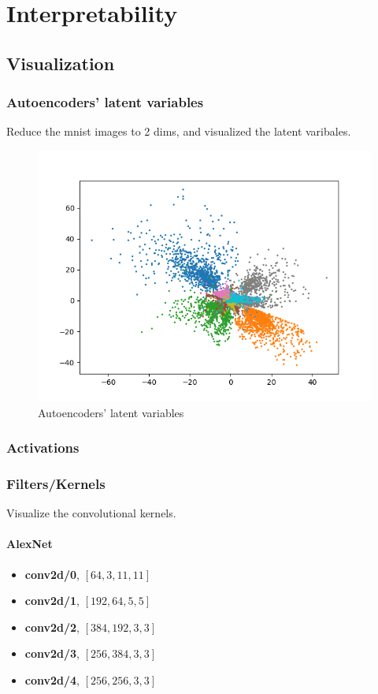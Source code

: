 \chapter{Interpretability}
\section{Visualization}
\subsection{Autoencoders' latent variables}
Reduce the mnist images to 2 dims, and visualized the latent varibales.

\begin{figure}[H]
    \centering
    \includegraphics[width=12cm]{images/ae_2dims_latent_variables.png}
    \caption{Autoencoders' latent variables}
    \label{fig:ae_2dims_latent_variables}
\end{figure}

\subsection{Activations}

\subsection{Filters/Kernels}
Visualize the convolutional kernels.
\subsubsection{AlexNet}
\begin{itemize}
    \item \textbf{conv2d/0}, $[64, 3, 11, 11]$
    \item \textbf{conv2d/1}, $[192, 64, 5, 5]$
    \item \textbf{conv2d/2}, $[384, 192, 3, 3]$
    \item \textbf{conv2d/3}, $[256, 384, 3, 3]$
    \item \textbf{conv2d/4}, $[256, 256, 3, 3]$
\end{itemize}

